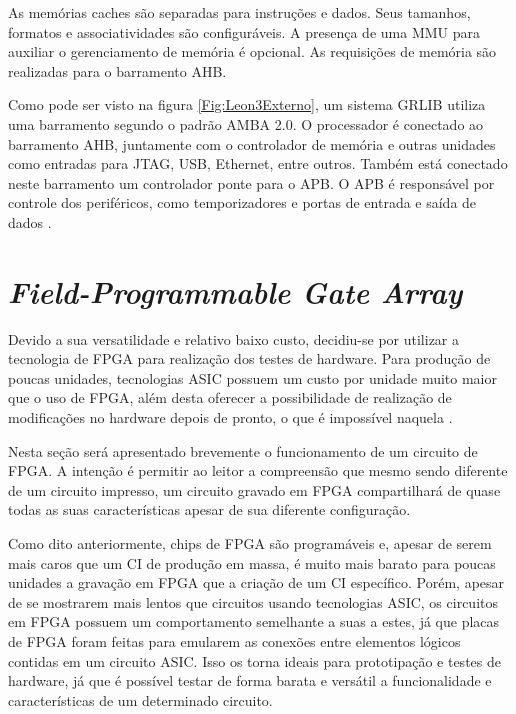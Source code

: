 As memórias caches são separadas para instruções e dados. Seus tamanhos, formatos e associatividades são configuráveis. A presença de uma MMU para auxiliar o gerenciamento de memória é opcional. As requisições de memória são realizadas para o barramento AHB.

Como pode ser visto na figura \ref{Fig:Leon3Externo}, um sistema GRLIB utiliza uma barramento segundo o padrão AMBA 2.0. O processador é conectado ao barramento AHB, juntamente com o controlador de memória e outras unidades como entradas para JTAG, USB, Ethernet, entre outros. Também está conectado neste barramento um controlador ponte para o APB. O APB é responsável por controle dos periféricos, como temporizadores e portas de entrada e saída de dados  \cite{grlibmanual}.


\section{\textit{Field-Programmable Gate Array}}
\label{Fundamentacao:FPGA}

Devido a sua versatilidade e relativo baixo custo, decidiu-se por utilizar a tecnologia de FPGA para realização dos testes de hardware. Para produção de poucas unidades, tecnologias ASIC possuem um custo por unidade muito maior que o uso de FPGA, além desta oferecer a possibilidade de realização de modificações no hardware depois de pronto, o que é impossível naquela \cite{chu2006rtl}.

Nesta seção será apresentado brevemente o funcionamento de um circuito de FPGA. A intenção é permitir ao leitor a compreensão que mesmo sendo diferente de um circuito impresso, um circuito gravado em FPGA compartilhará de quase todas as suas características apesar de sua diferente configuração.


Como dito anteriormente, chips de FPGA são programáveis e, apesar de serem mais caros que um CI de produção em massa, é muito mais barato para poucas unidades a gravação em FPGA que a criação de um CI específico. Porém, apesar de se mostrarem mais lentos que circuitos usando tecnologias ASIC, os circuitos em FPGA possuem um comportamento semelhante a suas a estes, já que placas de FPGA foram feitas para emularem as conexões entre elementos lógicos contidas em um circuito ASIC.
Isso os torna ideais para prototipação e testes de hardware, já que é possível testar de forma barata e versátil a funcionalidade e características de um determinado circuito. 

